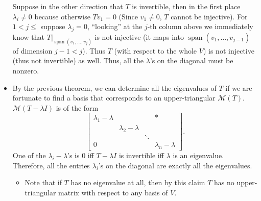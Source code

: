 \documentclass{article}
\newcommand{\s}{\operatorname{span}}
\newcommand{\M}{\mathcal{M}}
\begin{document}
\begin{itemize}
    Suppose in the other direction that $T$ is invertible, then in the first place $\lambda_i \not= 0$ because otherwise $Tv_1 = 0$ (Since $v_1 \not= 0$, $T$ cannot be injective). For $1 < j \leq $ suppose $\lambda_j = 0$, ``looking'' at the $j$-th column above we immediately know that $T|_{\s(v_1,\dots,v_j)}$ is not injective (it maps into $\s(v_1,\dots,v_{j-1})$ of dimension $j-1<j$). Thus $T$ (with respect to the whole $V$) is not injective (thus not invertible) as well. Thus, all the $\lambda$'s on the diagonal must be nonzero.
    \item By the previous theorem, we can determine all the eigenvalues of $T$ if we are fortunate to find a basis that corresponds to an upper-triangular $\M(T)$. $\M(T - \lambda I)$ is of the form
    \begin{equation*}
        \begin{bmatrix}
        \lambda_1 - \lambda & & & \ast \\
         & \lambda_2 - \lambda & & \\
         & & \ddots & \\
         0 & & & \lambda_n - \lambda
    \end{bmatrix}.
    \end{equation*}
    One of the $\lambda_i - \lambda$'s is 0 iff $T - \lambda I$ is invertible iff $\lambda$ is an eigenvalue. Therefore, all the entries $\lambda_i$'s on the diagonal are exactly all the eigenvalues.
    \begin{itemize}
        \item Note that if $T$ has no eigenvalue at all, then by this claim $T$ has no upper-triangular matrix with respect to any basis of $V$.
    \end{itemize}
\end{itemize}
\end{document}
